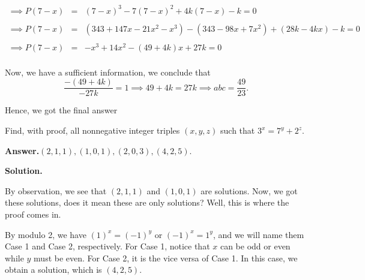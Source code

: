 \documentclass[12pt,paper=letter]{scrartcl}
\newcommand{\ans}[1]{{\sffamily \bfseries Answer.}\;\(\boxed{\text{#1}}\).}
\newcommand{\sol}{{\sffamily \bfseries Solution.}\;}
\begin{document}
\vspace{-2em}

\begin{center}
    \begin{equation*}
        \begin{array}{lll}
             \implies P(7-x) & = & (7-x)^3 - 7(7-x)^2 + 4k(7-x) - k = 0  \\
             
             \\
             
             \implies P(7-x) & = & (343 + 147x -21x^2 - x^3) - (343 - 98x + 7x^2)  + (28k - 4kx) - k = 0  \\
             
             \\
             
             \implies P(7-x) & = & −x^3 + 14x^2 - (49 + 4k)x + 27k = 0\\
        \end{array}
    \end{equation*}
\end{center}

Now, we have a sufficient information, we conclude that $$\dfrac{- (49 + 4k)}{-27k} = 1 \implies 49 + 4k = 27k \implies abc = \dfrac{49}{23}.$$

Hence, we got the final answer

\begin{probboxed}

Find, with proof, all nonnegative integer triples $(x,y,z)$ such that $3^x = 7^y + 2^z$.


\end{probboxed}

\ans{$(2,1,1), (1,0,1), (2,0,3), (4,2,5)$}

\sol

By observation, we see that $(2,1,1)$ and $(1,0,1)$ are solutions. Now, we got these solutions, does it mean these are only solutions? Well, this is where the proof comes in.

\vspace{2mm}

By modulo 2, we have $(1)^x = (-1)^y$ or $(-1)^x = 1^y$, and we will name them Case 1 and Case 2, respectively. For Case 1, notice that $x$ can be odd or even while $y$ must be even. For Case 2, it is the vice versa of Case 1. In this case, we obtain a solution, which is $(4,2,5)$.
\end{document}
